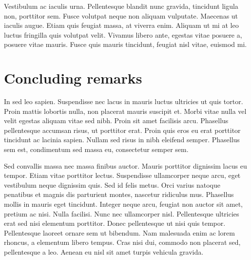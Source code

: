 Vestibulum ac iaculis urna. Pellentesque blandit nunc gravida, tincidunt ligula non, porttitor sem. Fusce volutpat neque non aliquam vulputate. Maecenas ut iaculis augue. Etiam quis feugiat massa, at viverra enim. Aliquam ut mi at leo luctus fringilla quis volutpat velit. Vivamus libero ante, egestas vitae posuere a, posuere vitae mauris. Fusce quis mauris tincidunt, feugiat nisl vitae, euismod mi.

\section{Concluding remarks}

In sed leo sapien. Suspendisse nec lacus in mauris luctus ultricies ut quis tortor. Proin mattis lobortis nulla, non placerat mauris suscipit et. Morbi vitae nulla vel velit egestas aliquam vitae sed nibh. Proin sit amet facilisis arcu. Phasellus pellentesque accumsan risus, ut porttitor erat. Proin quis eros eu erat porttitor tincidunt ac lacinia sapien. Nullam sed risus in nibh eleifend semper. Phasellus sem est, condimentum sed massa eu, consectetur semper sem.

Sed convallis massa nec massa finibus auctor. Mauris porttitor dignissim lacus eu tempor. Etiam vitae porttitor lectus. Suspendisse ullamcorper neque arcu, eget vestibulum neque dignissim quis. Sed id felis metus. Orci varius natoque penatibus et magnis dis parturient montes, nascetur ridiculus mus. Phasellus mollis in mauris eget tincidunt. Integer neque arcu, feugiat non auctor sit amet, pretium ac nisi. Nulla facilisi. Nunc nec ullamcorper nisl. Pellentesque ultricies erat sed nisi elementum porttitor. Donec pellentesque ut nisi quis tempor. Pellentesque laoreet ornare sem ut bibendum. Nam malesuada enim ac lorem rhoncus, a elementum libero tempus. Cras nisi dui, commodo non placerat sed, pellentesque a leo. Aenean eu nisl sit amet turpis vehicula gravida.